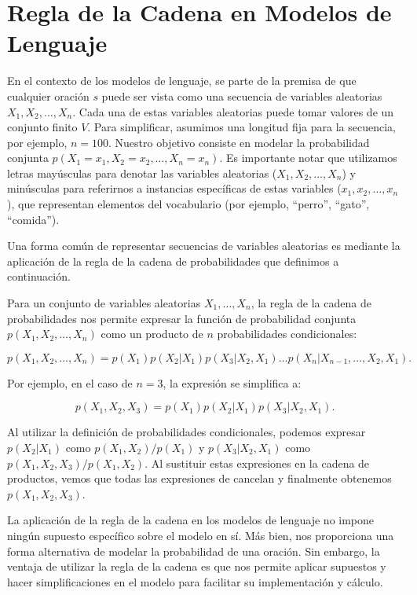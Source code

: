 \section{Regla de la Cadena en Modelos de Lenguaje}

En el contexto de los modelos de lenguaje, se parte de la premisa de que cualquier oración $s$ puede ser vista como una secuencia de variables aleatorias $X_1, X_2, \ldots, X_n$. Cada una de estas variables aleatorias puede tomar valores de un conjunto finito $V$. Para simplificar, asumimos una longitud fija para la secuencia, por ejemplo, $n = 100$. Nuestro objetivo consiste en modelar la probabilidad conjunta $p(X_1 = x_1, X_2 = x_2, \ldots, X_n = x_n)$. Es importante notar que utilizamos letras mayúsculas para denotar las variables aleatorias ($X_1, X_2, \ldots, X_n$) y minúsculas para referirnos a instancias específicas de estas variables ($x_1, x_2, \ldots, x_n$), que representan elementos del vocabulario (por ejemplo, ``perro'', ``gato'', ``comida'').

Una forma común de representar secuencias de variables aleatorias es mediante la aplicación de la regla de la cadena de probabilidades que definimos a continuación.

Para un conjunto de variables aleatorias $X_1,\ldots, X_n$, la regla de la cadena de probabilidades nos permite expresar la función de probabilidad conjunta $p(X_1,X_2,\ldots, X_n)$ como un producto de $n$ probabilidades condicionales:

\begin{equation}
p(X_1,X_2,\ldots,X_n)=p(X_1)p(X_2|X_1)p(X_3|X_2,X_1)\ldots p(X_n|X_{n-1},\ldots,X_2,X_1).
\end{equation}

Por ejemplo, en el caso de $n=3$, la expresión se simplifica a:

\begin{displaymath}
p(X_1,X_2,X_3)=p(X_1)p(X_2|X_1)p(X_3|X_2,X_1).
\end{displaymath}

Al utilizar la definición de probabilidades condicionales, podemos expresar $p(X_2|X_1)$ como $p(X_1,X_2)/p(X_1)$ y $p(X_3|X_2,X_1)$ como $p(X_1,X_2,X_3)/p(X_1,X_2)$. Al sustituir estas expresiones en la cadena de productos, vemos que todas las expresiones de cancelan y finalmente obtenemos $p(X_1,X_2,X_3)$.     

La aplicación de la regla de la cadena en los modelos de lenguaje no impone ningún supuesto específico sobre el modelo en sí. Más bien, nos proporciona una forma alternativa de modelar la probabilidad de una oración. Sin embargo, la ventaja de utilizar la regla de la cadena es que nos permite aplicar supuestos y hacer simplificaciones en el modelo para facilitar su implementación y cálculo.


